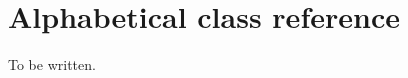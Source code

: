 \chapter{Alphabetical class reference}\label{classref}
%
\setfooter{\thepage}{}{}{}{}{\thepage}%

To be written.

\begin{comment}

\overview{Property classes overview}{propertyoverview}


\section{\class{wxBoolFormValidator}: wxPropertyFormValidator}\label{wxboolformvalidator}

\overview{Validator classes}{validatorclasses}

This class validates a boolean value for a form view. The associated panel item must be a wxCheckBox.

\membersection{wxBoolFormValidator::wxBoolFormValidator}

\func{void}{wxBoolFormValidator}{\param{long }{flags=0}}

Constructor.

\section{\class{wxBoolListValidator}: wxPropertyListValidator}\label{wxboollistvalidator}

\overview{Validator classes}{validatorclasses}

This class validates a boolean value for a list view.

\membersection{wxBoolListValidator::wxBoolListValidator}

\func{void}{wxBoolListValidator}{\param{long }{flags=0}}

Constructor.

\section{\class{wxIntegerFormValidator}: wxPropertyFormValidator}\label{wxintegerformvalidator}

\overview{Validator classes}{validatorclasses}

This class validates a range of integer values for a form view. The associated panel item must be a wxText
or wxSlider.


\end{comment}
